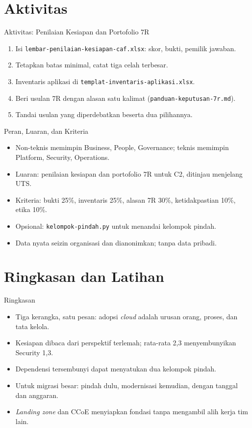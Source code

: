 \documentclass[aspectratio=169, table, 12pt]{beamer}
\begin{document}
\section{Aktivitas}

\begin{frame}{Aktivitas: Penilaian Kesiapan dan Portofolio 7R}
  \begin{enumerate}
    \item Isi \texttt{lembar-penilaian-kesiapan-caf.xlsx}: skor, bukti, pemilik jawaban.
    \item Tetapkan batas minimal, catat tiga celah terbesar.
    \item Inventaris aplikasi di \texttt{templat-inventaris-aplikasi.xlsx}.
    \item Beri usulan 7R dengan alasan satu kalimat
          (\texttt{panduan-keputusan-7r.md}).
    \item Tandai usulan yang diperdebatkan beserta dua pilihannya.
  \end{enumerate}
\end{frame}

\begin{frame}{Peran, Luaran, dan Kriteria}
  \begin{itemize}
    \item Non-teknis memimpin Business, People, Governance; teknis memimpin Platform,
          Security, Operations.
    \item Luaran: penilaian kesiapan dan portofolio 7R untuk C2, ditinjau menjelang UTS.
    \item Kriteria: bukti 25\%, inventaris 25\%, alasan 7R 30\%, ketidakpastian 10\%,
          etika 10\%.
    \item Opsional: \texttt{kelompok-pindah.py} untuk menandai kelompok pindah.
    \item Data nyata seizin organisasi dan dianonimkan; tanpa data pribadi.
  \end{itemize}
\end{frame}

\section{Ringkasan dan Latihan}

\begin{frame}{Ringkasan}
  \begin{itemize}
    \item Tiga kerangka, satu pesan: adopsi \textit{cloud} adalah urusan orang, proses,
          dan tata kelola.
    \item Kesiapan dibaca dari perspektif terlemah; rata-rata 2,3 menyembunyikan
          Security 1,3.
    \item Dependensi tersembunyi dapat menyatukan dua kelompok pindah.
    \item Untuk migrasi besar: pindah dulu, modernisasi kemudian, dengan tanggal dan
          anggaran.
    \item \textit{Landing zone} dan CCoE menyiapkan fondasi tanpa mengambil alih kerja
          tim lain.
  \end{itemize}
\end{frame}
\end{document}

